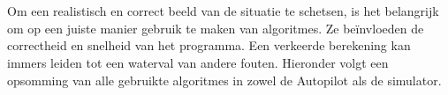 
\\
\\
Om een realistisch en correct beeld van de situatie te schetsen, is het belangrijk om op een juiste manier gebruik te maken van algoritmes. Ze be\"invloeden de correctheid en snelheid van het programma. Een verkeerde berekening kan immers leiden tot een waterval van andere fouten. Hieronder volgt een opsomming van alle gebruikte algoritmes in zowel de Autopilot als de simulator.